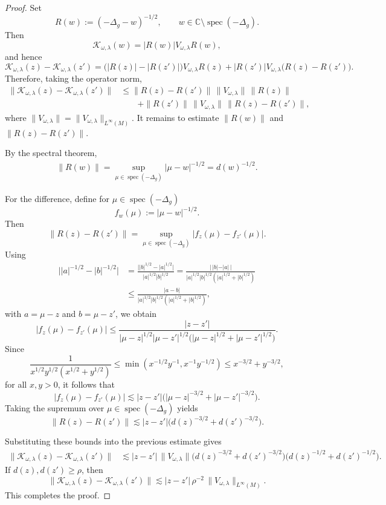 \documentclass[10pt,a4paper]{amsart}
\newcommand{\C}{\mathbb{C}}
\DeclareMathOperator{\spec}{spec}
\begin{document}
\begin{proof}
  Set
\[
R(w):=(-\Delta_g-w)^{-1/2},
\qquad
w\in \C\setminus \spec(-\Delta_g).
\]
Then
\[
\mathcal{K}_{\omega,\lambda}(w)=|R(w)|V_{\omega,\lambda}R(w),
\]
and hence
\[
\mathcal{K}_{\omega,\lambda}(z)-\mathcal{K}_{\omega,\lambda}(z')
=
\bigl(|R(z)|-|R(z')|\bigr)V_{\omega,\lambda}R(z)
+
|R(z')|V_{\omega,\lambda}\bigl(R(z)-R(z')\bigr).
\]
Therefore, taking the operator norm,
\begin{align*}
\|\mathcal{K}_{\omega,\lambda}(z)-\mathcal{K}_{\omega,\lambda}(z')\|
&\leq
\|R(z)-R(z')\|\,\|V_{\omega,\lambda}\|\,\|R(z)\| \\
&\qquad
+\|R(z')\|\,\|V_{\omega,\lambda}\|\,\|R(z)-R(z')\|,
\end{align*}
where $\|V_{\omega,\lambda}\|=\|V_{\omega,\lambda}\|_{L^{\infty}(M)}$.
It remains to estimate \(\|R(w)\|\) and \(\|R(z)-R(z')\|\).

By the spectral theorem,
\begin{align}\label{eq:trivial bound R(w)}
\|R(w)\|
=
\sup_{\mu\in \spec(-\Delta_g)} |\mu-w|^{-1/2}
=
d(w)^{-1/2}.
\end{align}

For the difference, define for \(\mu\in \spec(-\Delta_g)\)
\[
f_w(\mu):=|\mu-w|^{-1/2}.
\]
Then
\[
\|R(z)-R(z')\|
=
\sup_{\mu\in \spec(-\Delta_g)} |f_z(\mu)-f_{z'}(\mu)|.
\]
Using 
\begin{align*}
\bigl||a|^{-1/2}-|b|^{-1/2}\bigr|
&=
\frac{\bigl||b|^{1/2}-|a|^{1/2}\bigr|}{|a|^{1/2}|b|^{1/2}}
=
\frac{|\,|b|-|a|\,|}{|a|^{1/2}|b|^{1/2}(|a|^{1/2}+|b|^{1/2})}\\
&\leq
\frac{|a-b|}{|a|^{1/2}|b|^{1/2}(|a|^{1/2}+|b|^{1/2})},
\end{align*}
with \(a=\mu-z\) and \(b=\mu-z'\), we obtain
\[
|f_z(\mu)-f_{z'}(\mu)|
\leq
\frac{|z-z'|}{|\mu-z|^{1/2}|\mu-z'|^{1/2}
\bigl(|\mu-z|^{1/2}+|\mu-z'|^{1/2}\bigr)}.
\]
Since
\[
\frac{1}{x^{1/2}y^{1/2}(x^{1/2}+y^{1/2})}
\leq
\min(x^{-1/2}y^{-1},x^{-1}y^{-1/2})
\leq
x^{-3/2}+y^{-3/2},
\]
for all \(x,y>0\), it follows that
\[
|f_z(\mu)-f_{z'}(\mu)|
\lesssim
|z-z'|\bigl(|\mu-z|^{-3/2}+|\mu-z'|^{-3/2}\bigr).
\]
Taking the supremum over \(\mu\in \spec(-\Delta_g)\) yields
\[
\|R(z)-R(z')\|
\lesssim
|z-z'|\bigl(d(z)^{-3/2}+d(z')^{-3/2}\bigr).
\]

Substituting these bounds into the previous estimate gives
\begin{align*}
\|\mathcal{K}_{\omega,\lambda}(z)-\mathcal{K}_{\omega,\lambda}(z')\|
&\lesssim
|z-z'|\,\|V_{\omega,\lambda}\|
\bigl(d(z)^{-3/2}+d(z')^{-3/2}\bigr)
\bigl(d(z)^{-1/2}+d(z')^{-1/2}\bigr).
\end{align*}
If \(d(z),d(z')\geq \rho\), then
\[
\|\mathcal{K}_{\omega,\lambda}(z)-\mathcal{K}_{\omega,\lambda}(z')\|
\lesssim
|z-z'|\,\rho^{-2}\,\|V_{\omega,\lambda}\|_{L^{\infty}(M)}.
\]
This completes the proof.
\end{proof}
\end{document}
